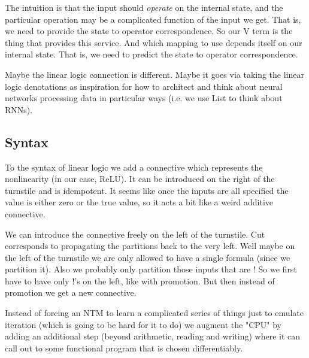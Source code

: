 \documentclass[english,letter paper,12pt,leqno]{article}
\theoremstyle{example}
\numberwithin{equation}{section}
\begin{document}
The intuition is that the input should \emph{operate} on the internal state, and the particular operation may be a complicated function of the input we get. That is, we need to provide the state to operator correspondence. So our V term is the thing that provides this service. And which mapping to use depends itself on our internal state. That is, we need to predict the state to operator correspondence. 

Maybe the linear logic connection is different. Maybe it goes via taking the linear logic denotations as inspiration for how to architect and think about neural networks processing data in particular ways (i.e. we use List to think about RNNs).

\subsection{Syntax}

To the syntax of linear logic we add a connective which represents the nonlinearity (in our case, ReLU). It can be introduced on the right of the turnstile and is idempotent. It seems like once the inputs are all specified the value is either zero or the true value, so it acts a bit like a weird additive connective. 

We can introduce the connective freely on the left of the turnstile. Cut corresponds to propagating the partitions back to the very left. Well maybe on the left of the turnstile we are only allowed to have a single formula (since we partition it). Also we probably only partition those inputs that are ! So we first have to have only !’s on the left, like with promotion. But then instead of promotion we get a new connective.

Instead of forcing an NTM to learn a complicated series of things just to emulate iteration (which is going to be hard for it to do) we augment the "CPU" by adding an additional step (beyond arithmetic, reading and writing) where it can call out to some functional program that is chosen differentiably.


\providecommand{\bysame}{\leavevmode\hbox to3em{\hrulefill}\thinspace}
\providecommand{\href}[2]{#2}
\begin{thebibliography}{BHLS03}
  


\end{thebibliography}
\end{document}
